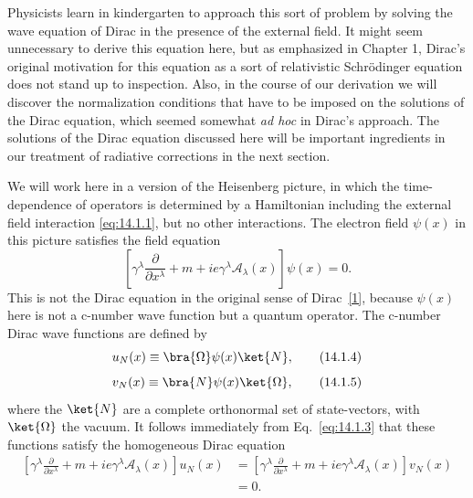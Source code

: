 Physicists learn in kindergarten to approach this sort of problem by solving
the wave equation of Dirac in the presence of the external field. It might seem
unnecessary to derive this equation here, but as emphasized in Chapter 1,
Dirac's original motivation for this equation as a sort of relativistic
Schr\"odinger equation does not stand up to inspection. Also, in the course of
our derivation we will discover the normalization conditions that have to be
imposed on the solutions of the Dirac equation, which seemed somewhat
\emph{ad hoc} in Dirac's approach. The solutions of the Dirac equation
discussed here will be important ingredients in our treatment of radiative
corrections in the next section.

We will work here in a version of the Heisenberg picture, in which the
time-dependence of operators is determined by a Hamiltonian including the
external field interaction \eqref{eq:14.1.1}, but no other interactions. The
electron field $\psi(x)$ in this picture satisfies the field equation
\begin{equation}
  \left[\gamma^\lambda\frac{\partial}{\partial x^\lambda}
  +m+ie\gamma^\lambda\mathcal A_\lambda(x)\right]\psi(x)=0.
  \tag{14.1.3}\label{eq:14.1.3}
\end{equation}
This is not the Dirac equation in the original sense of
Dirac~\hyperlink{ref:14.1}{[1]}, because $\psi(x)$ here is not a c-number wave
function but a quantum operator. The c-number Dirac wave functions are defined
by
\begin{equation}
  u_N(x)\equiv\bra{\Omega}\psi(x)\ket{N},
  \tag{14.1.4}\label{eq:14.1.4}
\end{equation}
\begin{equation}
  v_N(x)\equiv\bra{N}\psi(x)\ket{\Omega},
  \tag{14.1.5}\label{eq:14.1.5}
\end{equation}
where the $\ket{N}$ are a complete orthonormal set of state-vectors, with
$\ket{\Omega}$ the vacuum. It follows immediately from Eq.~\eqref{eq:14.1.3}
that these functions satisfy the homogeneous Dirac equation
\begin{equation}
\begin{aligned}
\left[\gamma^\lambda\frac{\partial}{\partial x^\lambda}
 +m+ie\gamma^\lambda\mathcal A_\lambda(x)\right]u_N(x)
&=\left[\gamma^\lambda\frac{\partial}{\partial x^\lambda}
 +m+ie\gamma^\lambda\mathcal A_\lambda(x)\right]v_N(x)\\
&=0.
\end{aligned}
\tag{14.1.6}\label{eq:14.1.6}
\end{equation}
